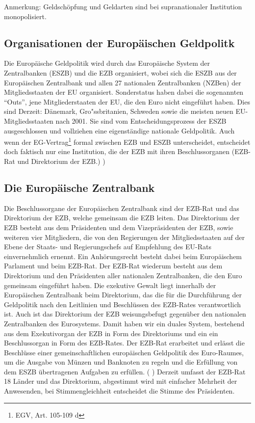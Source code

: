 \documentclass[
    onecolumn,
    a4paper,
    abstracton,
    parskip=half
    ,final
    ]{scrartcl}
\begin{document}
Anmerkung: Geldschöpfung und Geldarten sind bei supranationaler Institution monopolisiert.



\subsection{Organisationen der Europ{\"a}ischen Geldpolitk}

Die Europ{\"a}ische Geldpolitik wird durch das Europ{\"a}ische System der Zentralbanken (ESZB) und die EZB organisiert, wobei sich die ESZB aus der Europ{\"a}ischen Zentralbank und allen 27 nationalen Zentralbanken (NZBen) der Mitgliedsstaaten der EU organisiert.
Sonderstatus haben dabei die sogenannten "`Outs"', jene Mitgliederstaaten der EU, die den Euro  nicht eingef{\"u}hrt haben. Dies sind Derzeit: D{\"a}nemark, Gro{"ss}britanien, Schweden sowie die meisten neuen EU-Mitgliedsstaaten nach 2001. Sie sind vom Entscheidungsprozess der ESZB ausgeschlossen und vollziehen eine eigenst{\"a}ndige nationale Geldpolitik.
Auch wenn der EG-Vertrag\footnote[25]{EGV, Art. 105-109 d} formal zwischen EZB und ESZB unterscheidet, entscheidet doch faktisch nur eine Institution, die der EZB mit ihren Beschlussorganen (EZB-Rat und Direktorium der EZB.) \citep[vgl.][S.553]{Basseler2010})

\subsection{Die Europ{\"a}ische Zentralbank}
Die Beschlussorgane der Europ{\"a}ischen Zentralbank sind der EZB-Rat und das Direktorium der EZB, welche gemeinsam die EZB leiten. Das Direktorium der EZB besteht aus dem Pr{\"a}sidenten und dem Vizepr{\"a}sidenten der EZB, sowie weiteren vier Mitgliedern, die von den Regierungen der Mitgliedsstaaten auf der Ebene der Staats- und Regierungschefs auf Empfehlung des EU-Rats einvernehmlich ernennt. Ein Anh{\"o}rungsrecht besteht dabei beim Europ{\"a}ischem Parlament und beim EZB-Rat.
Der EZB-Rat wiederum besteht aus dem Direktorium und den Pr{\"a}sidenten aller nationalen Zentralbanken, die den Euro gemeinsam eingef{\"u}hrt haben.
Die exekutive Gewalt liegt innerhalb der Europ{\"a}ischen Zentralbank beim Direktorium, das die f{\"u}r die Durchf{\"u}hrung der Geldpolitik nach den Leitlinien und Beschl{\"u}ssen des EZB-Rates verantwortlich ist. Auch ist das Direktorium der EZB weisungsbefugt gegen{\"u}ber den nationalen Zentralbanken des Eurosystems.  Damit haben wir ein duales System, bestehend aus dem Exekutivorgan der EZB in Form des Direktoriums und ein ein Beschlussorgan in Form des EZB-Rates.
Der EZB-Rat erarbeitet und erl{\"a}sst die Beschl{\"u}sse einer gemeinschaftlichen europ{\"a}ischen Geldpolitik des Euro-Raumes, um die Ausgabe von M{\"u}nzen und Banknoten zu regeln und die Erf{\"u}llung von dem ESZB {\"u}bertragenen Aufgaben zu erf{\"u}llen.  ( \citep[vgl.][S.553]{Basseler2010} ) Derzeit umfasst der EZB-Rat 18 L{\"a}nder und das Direktorium, abgestimmt wird mit einfacher Mehrheit der Anwesenden, bei Stimmengleichheit entscheidet die Stimme des Pr{\"a}sidenten.
\end{document}
